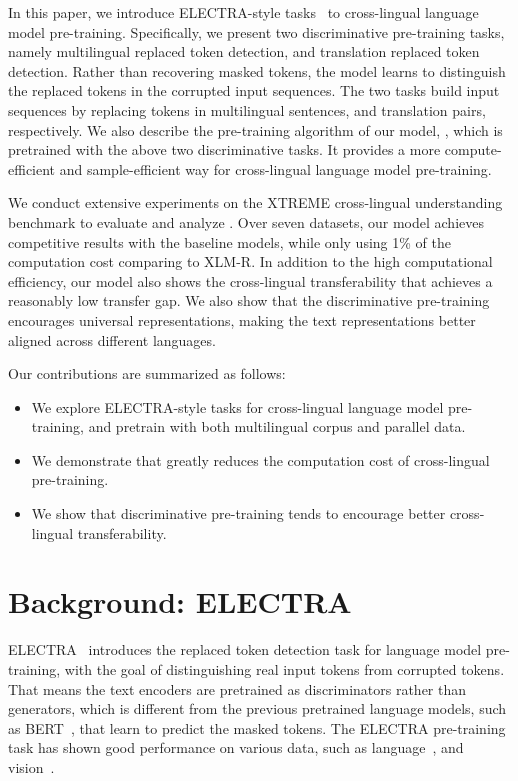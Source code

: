\documentclass[11pt]{article}
\newcommand\our{\makebox{\textsc{XLM-E}}}
\newcommand\ele{\textsc{ELECTRA}}
\begin{document}
In this paper, we introduce ELECTRA-style tasks~\cite{electra} to cross-lingual language model pre-training.
Specifically, we present two discriminative pre-training tasks, namely multilingual replaced token detection, and translation replaced token detection. 
Rather than recovering masked tokens, the model learns to distinguish the replaced tokens in the corrupted input sequences.
The two tasks build input sequences by replacing tokens in multilingual sentences, and translation pairs, respectively. 
We also describe the pre-training algorithm of our model, \our{}, which is pretrained with the above two discriminative tasks.
It provides a more compute-efficient and sample-efficient way for cross-lingual language model pre-training.

We conduct extensive experiments on the XTREME cross-lingual understanding benchmark to evaluate and analyze \our{}. Over seven datasets, our model achieves competitive results with the baseline models, while only using 1\% of the computation cost comparing to XLM-R.
In addition to the high computational efficiency, our model also shows the cross-lingual transferability that achieves a reasonably low transfer gap.
We also show that the discriminative pre-training encourages universal representations, making the text representations better aligned across different languages.

Our contributions are summarized as follows:
\begin{itemize}
\item We explore ELECTRA-style tasks for cross-lingual language model pre-training, and pretrain \our{} with both multilingual corpus and parallel data.
\item We demonstrate that \our{} greatly reduces the computation cost of cross-lingual pre-training.
\item We show that discriminative pre-training tends to encourage better cross-lingual transferability.
\end{itemize}


\section{Background: \ele{}}
\label{sec:ele}

\ele{}~\cite{electra} introduces the replaced token detection task for language model pre-training, with the goal of distinguishing real input tokens from corrupted tokens.
That means the text encoders are pretrained as discriminators rather than generators, which is different from the previous pretrained language models, such as BERT~\cite{bert}, that learn to predict the masked tokens.
The ELECTRA pre-training task has shown good performance on various data, such as language~\cite{hao-etal-2021-learning}, and vision~\cite{Fang2022CorruptedIM}.
\end{document}

